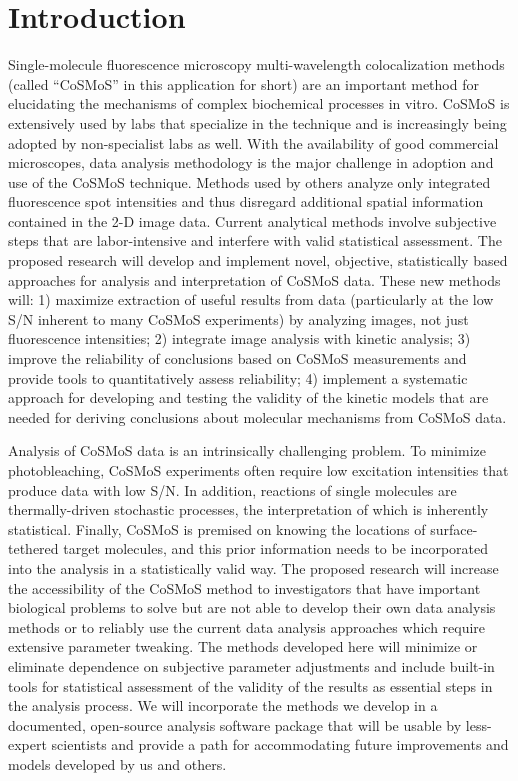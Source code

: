 \section{Introduction}

Single-molecule fluorescence microscopy multi-wavelength colocalization methods (called “CoSMoS” in this application for short) are an important method for elucidating the mechanisms of complex biochemical processes in vitro. CoSMoS is extensively used by labs that specialize in the technique and is increasingly being adopted by non-specialist labs as well. With the availability of good commercial microscopes, data analysis methodology is the major challenge in adoption and use of the CoSMoS technique. Methods used by others analyze only integrated fluorescence spot intensities and thus disregard additional spatial information contained in the 2-D image data. Current analytical methods involve subjective steps that are labor-intensive and interfere with valid statistical assessment. The proposed research will develop and implement novel, objective, statistically based approaches for analysis and interpretation of CoSMoS data. These new methods will: 1) maximize extraction of useful results from data (particularly at the low S/N inherent to many CoSMoS experiments) by analyzing images, not just fluorescence intensities; 2) integrate image analysis with kinetic analysis; 3) improve the reliability of conclusions based on CoSMoS measurements and provide tools to quantitatively assess reliability; 4) implement a systematic approach for developing and testing the validity of the kinetic models that are needed for deriving conclusions about molecular mechanisms from CoSMoS data.

Analysis of CoSMoS data is an intrinsically challenging problem. To minimize photobleaching, CoSMoS experiments often require low excitation intensities that produce data with low S/N. In addition, reactions of single molecules are thermally-driven stochastic processes, the interpretation of which is inherently statistical. Finally, CoSMoS is premised on knowing the locations of surface-tethered target molecules, and this prior information needs to be incorporated into the analysis in a statistically valid way. The proposed research will increase the accessibility of the CoSMoS method to investigators that have important biological problems to solve but are not able to develop their own data analysis methods or to reliably use the current data analysis approaches which require extensive parameter tweaking. The methods developed here will minimize or eliminate dependence on subjective parameter adjustments and include built-in tools for statistical assessment of the validity of the results as essential steps in the analysis process. We will incorporate the methods we develop in a documented, open-source analysis software package that will be usable by less-expert scientists and provide a path for accommodating future improvements and models developed by us and others.

